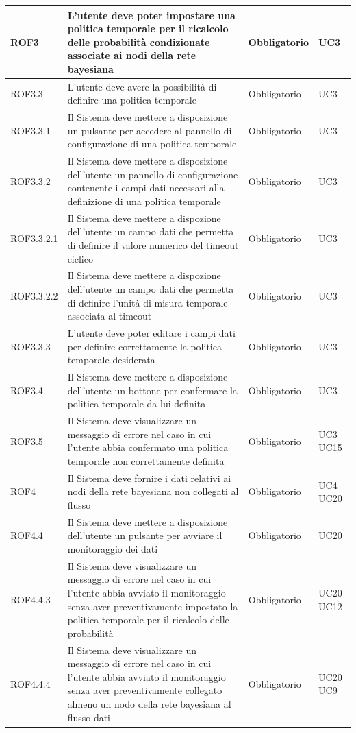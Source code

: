 \begin{center}
\begin{longtable}[c]{|m{}|m{}|m{}|m{}|}
\hline
ROF3 & L'utente deve poter impostare una politica temporale per il ricalcolo delle probabilità condizionate associate ai nodi della rete bayesiana & Obbligatorio & UC3\\
\hline
\rowcolor{grigio}ROF3.3 & L'utente deve avere la possibilità di definire una politica temporale & Obbligatorio & UC3\\ 
\hline
ROF3.3.1 & Il Sistema deve mettere a disposizione un pulsante per accedere al pannello di configurazione di una politica temporale & Obbligatorio & UC3\\
\hline
\rowcolor{grigio}ROF3.3.2 & Il Sistema deve mettere a disposizione dell'utente un pannello di configurazione contenente i campi dati necessari alla definizione di una politica temporale & Obbligatorio & UC3\\
\hline
ROF3.3.2.1 & Il Sistema deve mettere a dispozione dell'utente un campo dati che permetta di definire il valore numerico del timeout ciclico & Obbligatorio & UC3\\
\hline
\rowcolor{grigio}ROF3.3.2.2 & Il Sistema deve mettere a dispozione dell'utente un campo dati che permetta di definire l'unità di misura temporale associata al timeout & Obbligatorio & UC3\\
\hline
ROF3.3.3 & L'utente deve poter editare i campi dati per definire correttamente la politica temporale desiderata & Obbligatorio & UC3\\
\hline
\rowcolor{grigio}ROF3.4 & Il Sistema deve mettere a disposizione dell'utente un bottone per confermare la politica temporale da lui definita & Obbligatorio & UC3\\
\hline
ROF3.5 & Il Sistema deve visualizzare un messaggio di errore nel caso in cui l'utente abbia confermato una politica temporale non correttamente definita & Obbligatorio & UC3 UC15\\
\hline
\rowcolor{grigio}ROF4 & Il Sistema deve fornire i dati relativi ai nodi della rete bayesiana non collegati al flusso & Obbligatorio & UC4 UC20\\
\hline
ROF4.4 & Il Sistema deve mettere a disposizione dell'utente un pulsante per avviare il monitoraggio dei dati & Obbligatorio & UC20\\
\hline
\rowcolor{grigio}ROF4.4.3 & Il Sistema deve visualizzare un messaggio di errore nel caso in cui l'utente abbia avviato il monitoraggio senza aver preventivamente impostato la politica temporale per il ricalcolo delle probabilità & Obbligatorio & UC20 UC12\\
\hline
ROF4.4.4 & Il Sistema deve visualizzare un messaggio di errore nel caso in cui l'utente abbia avviato il monitoraggio senza aver preventivamente collegato almeno un nodo della rete bayesiana al flusso dati & Obbligatorio & UC20 UC9\\

\end{longtable}
\end{center}

